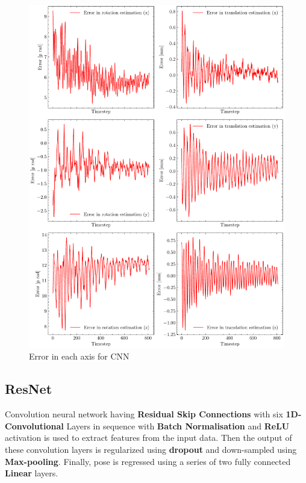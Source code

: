 \begin{figure}[H]
    \centering
    \includegraphics[scale=0.5]{images/fig_chapter4/nn_related/error_in_predicted_vs_ground_truth_cnn.pdf}
    \caption{Error in each axis for CNN}
    \label{fig:cnn_error}
\end{figure}

\subsection{ResNet}
Convolution neural network having \textbf{Residual Skip Connections} with six \textbf{1D-Convolutional} Layers in sequence with \textbf{Batch Normalisation} and  \textbf{ReLU} activation is used to extract features from the input data. Then the output of these convolution layers is regularized using \textbf{dropout} and down-sampled using \textbf{Max-pooling}. Finally, pose is regressed using a series of two fully connected \textbf{Linear} layers. 

